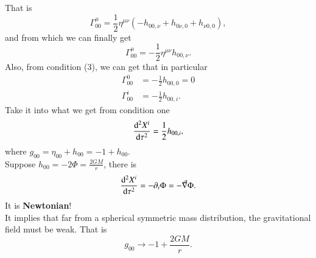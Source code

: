 \documentclass[openany,10pt]{book}
\theoremstyle{definition}
\theoremstyle{definition}
\theoremstyle{remark}
\begin{document}
That is 
\begin{equation}
    \Gamma^\mu_{00}=\frac{1}{2}\eta^{\mu\nu}(-h_{00,\nu}+h_{0\nu,0}+h_{\nu0,0}),
\end{equation}
and from which we can finally get 
\begin{equation}
    \Gamma^\mu_{00}=-\frac{1}{2}\eta^{\mu\nu}h_{00,\nu}.
\end{equation}
Also, from condition (3), we can get that in particular 
\begin{equation}
    \begin{aligned}
        \Gamma^0_{00}&=-\frac{1}{2}h_{00,0}=0\\
        \Gamma^i_{00}&=-\frac{1}{2}h_{00,i}.
    \end{aligned}
\end{equation}
Take it into what we get from condition one 
\begin{equation}
    \frac{{\rm{d}}^2X^i}{{\rm{d}}\tau^2}=\frac{1}{2}h_{00,i},
\end{equation}
where $g_{00}=\eta_{00}+h_{00}=-1+h_{00}$.\\
Suppose $h_{00}=-2\Phi=\frac{2GM}{r}$, there is
\begin{equation}
    \frac{{\rm{d}}^2X^i}{{\rm{d}}\tau^2}=-\partial_i\Phi=-\vec{\nabla}\Phi.
\end{equation}
It is \textbf{Newtonian}!\\
It implies that far from a spherical symmetric mass distribution, the gravitational field must be weak. That is 
\begin{equation}
    g_{00}\to-1+\frac{2GM}{r}.
\end{equation}
\end{document}

